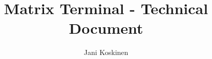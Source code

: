 \documentclass[a4paper]{ltxdoc}
\begin{document}
\title{Matrix Terminal - Technical Document}
\author{Jani Koskinen}
\maketitle


\tableofcontents









\end{document}
